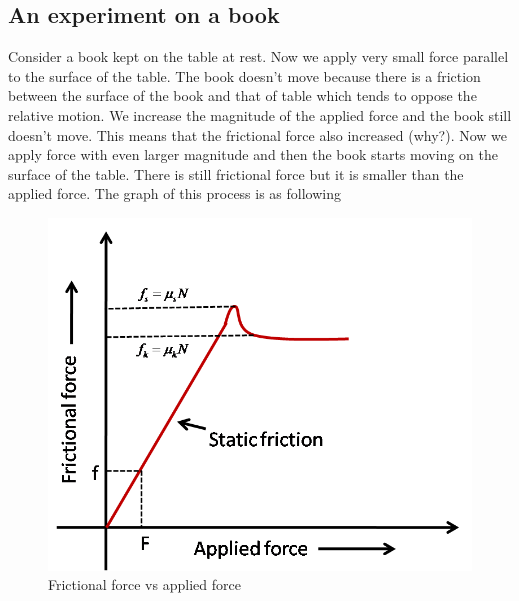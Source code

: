 \documentclass[10pt]{article}
\begin{document}
\subsection{An experiment on a book}
Consider a book kept on the table at rest.  Now we apply very small force parallel to the surface of the table.  The book doesn't move because there is a friction between the surface of the book and that of table which tends to oppose the relative motion.  We increase the magnitude of the applied force and the book still doesn't move.  This means that the frictional force also increased (why?). Now we apply force with even larger magnitude and then the book starts moving on the surface of the table.  There is still frictional force but it is smaller than the applied force.  The graph of this process is as following      
\begin{figure}[h]
\label{skfriction}
\includegraphics[scale=.5]{static_fric}
\centering
\caption{Frictional force vs applied force}
\centering
\end{figure}
\end{document}
